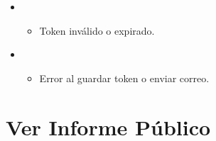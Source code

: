 \documentclass[letterpaper,10pt,spanish]{sphinxmanual}
\begin{document}
\begin{fulllineitems}
\begin{itemize}
\begin{itemize}
\end{itemize}

\begin{sphinxVerbatim}[commandchars=\\\{\}]
\end{sphinxVerbatim}

\item {} 
\sphinxAtStartPar
{}
\begin{itemize}
\item {} 
\sphinxAtStartPar
Token inválido o expirado.

\end{itemize}

\item {} 
\sphinxAtStartPar
{}
\begin{itemize}
\item {} 
\sphinxAtStartPar
Error al guardar token o enviar correo.

\end{itemize}

\end{itemize}

\end{fulllineitems}



\section{Ver Informe Público}
\label{\detokenize{endpoints:ver-informe-publico}}
\end{document}
